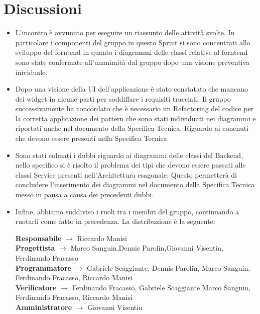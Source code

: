 \documentclass[a4paper,12pt]{article}
\begin{document}
\section{Discussioni}
\begin{itemize}
    \item L'incontro è avvunuto per eseguire un riassunto delle attività svolte. In particolare i componenti del gruppo in questo 
Sprint si sono concentrati allo sviluppo del forntend in quanto i diagrammi delle classi relative al forntend sono state confermate all'unanimità dal gruppo 
dopo una visione preventiva inividuale.
    \item Dopo una visione della UI dell'applicazione è stato constatato che mancano dei widget in alcune parti per soddiffare i requisiti tracciati. Il gruppo successivamente 
ha concordato che è necessario un Refactoring del codice per la corretta applicazione dei pattern che sono stati individuati nei diagrammi e 
riportati anche nel documento della Specifica Tecnica. Riguardo ai conenuti che devono essere presenti nella Specifica Tecnica
    \item Sono stati colmati i dubbi riguardo ai diagrammi delle classi del Backend, nello specifico si è risolto il problema dei tipi che devono essere passati alle classi Service presenti nell'Architettura esagonale. Questo permetterà di concludere 
l'inserimento dei diagrammi nel documento della Specifica Tecnica messo in pausa a causa dei precedenti dubbi.
    \item Infine, abbiamo suddiviso i ruoli tra i membri del gruppo, continuando a ruotarli come fatto in precedenza. La distribuzione è la seguente:
    \begin{center}
        \textbf{Responsabile} $\rightarrow$ Riccardo Manisi\\
        \textbf{Progettista} $\rightarrow$ Marco Sanguin,Dennis Parolin,Giovanni Visentin, Ferdinando Fracasso\\
        \textbf{Programmatore} $\rightarrow$ Gabriele Scaggiante, Dennis Parolin, Marco Sanguin, Ferdinando Fracasso, Riccardo Manisi\\
        \textbf{Verificatore} $\rightarrow$ Ferdinando Fracasso, Gabriele Scaggiante Marco Sanguin, Ferdinando Fracasso, Riccardo Manisi\\
        \textbf{Amministratore} $\rightarrow$ Giovanni Visentin
    \end{center}
\end{itemize}
\end{document}
